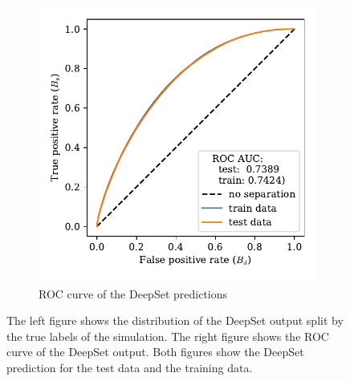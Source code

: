 \begin{figure}
\begin{subfigure}{0.5\textwidth}
        \includegraphics[width=\textwidth]{images/B_ROC.pdf}
        \caption{ROC curve of the DeepSet predictions}
        \label{fig:B_ROC}
    \end{subfigure}%
    \caption{The left figure shows the distribution of the DeepSet output split by the true labels of the simulation. The right figure shows the ROC curve of the DeepSet output. Both figures show the DeepSet prediction for the test data and the training data.}
    \label{fig:B_eval}
\end{figure}

